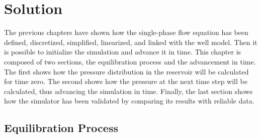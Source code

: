 \chapter{Solution}
\label{chapter-solution}

The previous chapters have shown how the single-phase flow equation has been defined, discretized, simplified, linearized, and linked with the well model.
%
Then it is possible to initialize the simulation and advance it in time.
%
This chapter is composed of two sections, the equilibration process and the advancement in time.
%
The first shows how the pressure distribution in the reservoir will be calculated for time zero.
%
The second shows how the pressure at the next time step will be calculated, thus advancing the simulation in time.
%
Finally, the last section shows how the simulator has been validated by comparing its results with reliable data.

\section{Equilibration Process}

